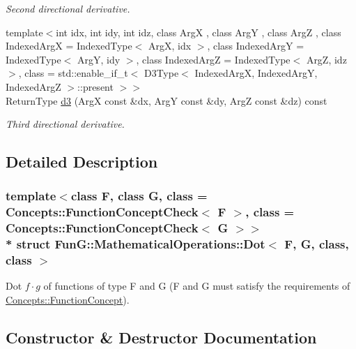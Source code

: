\begin{DoxyCompactItemize}
\begin{DoxyCompactList}\small\item\em Second directional derivative. \end{DoxyCompactList}\item 
{\footnotesize template$<$int idx, int idy, int idz, class ArgX , class ArgY , class ArgZ , class Indexed\+ArgX  = Indexed\+Type$<$ Arg\+X, idx $>$, class Indexed\+ArgY  = Indexed\+Type$<$ Arg\+Y, idy $>$, class Indexed\+ArgZ  = Indexed\+Type$<$ Arg\+Z, idz $>$, class  = std\+::enable\+\_\+if\+\_\+t$<$                           D3\+Type$<$ Indexed\+Arg\+X, Indexed\+Arg\+Y, Indexed\+Arg\+Z $>$\+::present $>$$>$ }\\Return\+Type \hyperlink{structFunG_1_1MathematicalOperations_1_1Dot_a1fe7dc4596f532e9568e48945c07d00b}{d3} (ArgX const \&dx, ArgY const \&dy, ArgZ const \&dz) const 
\begin{DoxyCompactList}\small\item\em Third directional derivative. \end{DoxyCompactList}\end{DoxyCompactItemize}


\subsection{Detailed Description}
\subsubsection*{template$<$class F, class G, class = Concepts\+::\+Function\+Concept\+Check$<$ F $>$, class = Concepts\+::\+Function\+Concept\+Check$<$ G $>$$>$\\*
struct Fun\+G\+::\+Mathematical\+Operations\+::\+Dot$<$ F, G, class, class $>$}

Dot $f \cdot g$ of functions of type F and G (F and G must satisfy the requirements of \hyperlink{structFunG_1_1Concepts_1_1FunctionConcept}{Concepts\+::\+Function\+Concept}). 

\subsection{Constructor \& Destructor Documentation}

